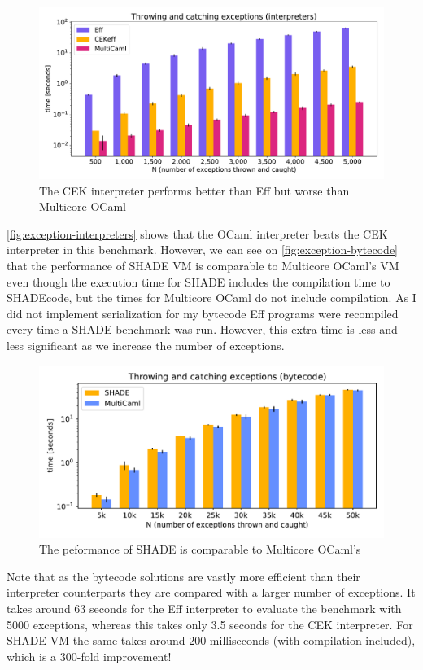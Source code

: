 \documentclass[class=article, crop=false]{standalone}
\begin{document}
\begin{figure}[htb]
    \centering
    \includegraphics[width=.9\linewidth]{eval_plots/interp_exception.pdf}
    \caption[Exception benchmark (interpreters)]{The CEK interpreter performs better than Eff but worse than Multicore OCaml}
    \label{fig:exception-interpreters}
\end{figure}

\autoref{fig:exception-interpreters} shows that the OCaml interpreter beats
the CEK interpreter in this benchmark. However, we can see on
\autoref{fig:exception-bytecode} that the performance of SHADE VM is
comparable to Multicore OCaml's VM even though the
execution time for SHADE includes the compilation time to SHADEcode,
but the times for Multicore OCaml do not include compilation. As I did not
implement serialization for my bytecode Eff programs were recompiled every time
a SHADE benchmark was run. However, this extra time is less and less significant
as we increase the number of exceptions.

\begin{figure}[htb]
    \centering
    \includegraphics[width=.8\linewidth]{eval_plots/comp_exception.pdf}
    \caption[Exception benchmark (compilers)]{The peformance of SHADE is comparable to Multicore OCaml's}
    \label{fig:exception-bytecode}
\end{figure}

Note that as the bytecode solutions are vastly more efficient than their
interpreter counterparts they are compared with a larger number of exceptions.
It takes around 63 seconds for the Eff interpreter to evaluate the benchmark
with 5000 exceptions, whereas this takes only 3.5 seconds for the CEK
interpreter. For SHADE VM the same takes around 200 milliseconds
(with compilation included), which is a 300-fold improvement!
\end{document}

